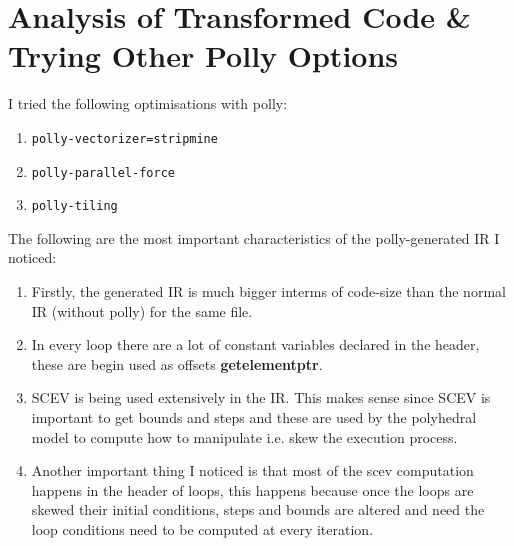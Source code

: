 \documentclass[a4paper,12pt]{report}
\begin{document}
\section{Analysis of Transformed Code \& Trying Other Polly Options}
I tried the following optimisations with polly:
\begin{enumerate}
\item \texttt{polly-vectorizer=stripmine}
\item \texttt{polly-parallel-force}
\item \texttt{polly-tiling}
\end{enumerate}
The following are the most important characteristics of the polly-generated IR I noticed:
\begin{enumerate}
\item Firstly, the generated IR is much bigger interms of code-size than the normal IR (without polly) for the same file.
\item In every loop there are a lot of constant variables declared in the header, these are begin used as offsets \textbf{getelementptr}.
\item SCEV is being used extensively in the IR. This makes sense since SCEV is important to get bounds and steps and these are used by the polyhedral model to compute how to manipulate i.e. skew the execution process.
\item Another important thing I noticed is that most of the scev computation happens in the header of loops, this happens because once the loops are skewed their initial conditions, steps and bounds are altered and need the loop conditions need to be computed at every iteration.
\end{enumerate}
\newpage
\end{document}
